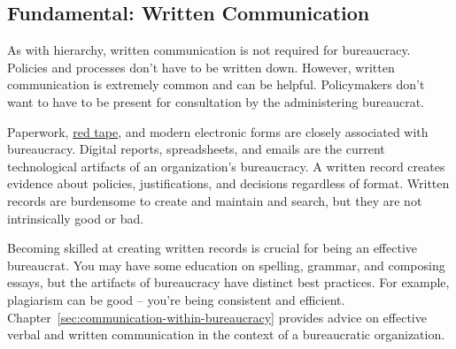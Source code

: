\subsection*{Fundamental: Written Communication\label{sec:written-communication}}

As with hierarchy, written communication is not required for bureaucracy. Policies and processes don't have to be written down. However, written communication is extremely common and can be helpful. 
Policymakers don't want to have to be present for consultation by the administering bureaucrat.

Paperwork,  \href{https://en.wikipedia.org/wiki/Red_tape}{red tape},
and modern electronic forms are closely associated with bureaucracy.
Digital reports, spreadsheets, and emails are the current technological artifacts of an organization's bureaucracy. A written record creates evidence about policies, justifications, and decisions regardless of format. %
Written records are burdensome to create and maintain and search, but they are not intrinsically good or bad. 

Becoming skilled at creating written records is crucial for being an effective bureaucrat. You may have some education on spelling, grammar, and composing essays, but the artifacts of bureaucracy have distinct best practices. For example, plagiarism can be good -- you're being consistent and efficient.  
Chapter~\ref{sec:communication-within-bureaucracy} 
%
provides advice on effective verbal and written communication in the context of a bureaucratic organization. 